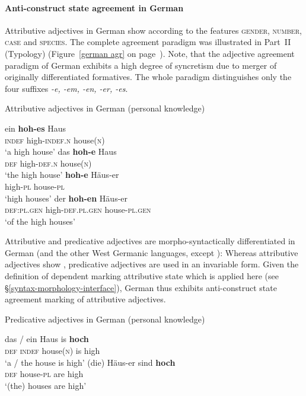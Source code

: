 \paragraph*{Anti\hyp{}construct state agreement in German}
Attributive adjectives in German show  according to the features \textsc{gender, number, case} and \textsc{species}. The complete agreement paradigm was illustrated in Part~II (Typology) (Figure~\ref{german agr} on page~\pageref{german agr}). Note, that the adjective agreement paradigm of German exhibits a high degree of syncretism due to merger of originally differentiated formatives. The whole paradigm distinguishes only the four suffixes \textit{-e, -em, -en, -er, -es}.
\begin{exe}
\ex \rm{Attributive adjectives in German (personal knowledge)}
\begin{xlist}
\ex
\gll	ein \textbf{hoh-es} Haus\\
	\textsc{indef} high-\textsc{indef.n} house(\textsc{n})\\
\glt	‘a high house’
\ex	
\gll	das \textbf{hoh-e} Haus\\
	\textsc{def} high-\textsc{def.n} house(\textsc{n})\\
\glt	‘the high house’
\ex	
\gll	\textbf{hoh-e} Häus-er\\
	high-\textsc{pl} house-\textsc{pl}\\
\glt	‘high houses’
\ex	
\gll	der \textbf{hoh-en} Häus-er\\
	\textsc{def:pl.gen} high-\textsc{def.pl.gen} house-\textsc{pl.gen}\\
\glt	‘of the high houses’
\end{xlist}
\end{exe}
Attributive and predicative adjectives are morpho-syntactically differentiated in German (and the other West Germanic languages, except ): Whereas attributive adjectives show , predicative adjectives are used in an invariable form. Given the definition of dependent marking attributive state which is applied here (see \S\ref{syntax-morphology-interface}), German thus exhibits anti\hyp{}construct state agreement marking of attributive adjectives.
\begin{exe}
\ex \rm{Predicative adjectives in German (personal knowledge)}
\begin{xlist}
\ex
\gll	das / ein Haus is \textbf{hoch}\\
	\textsc{def} {} \textsc{indef} house(\textsc{n}) is high\\
\glt	‘a / the house is high’
\ex	
\gll	(die) Häus-er sind \textbf{hoch}\\
	\textsc{def} house-\textsc{pl} are high\\
\glt	‘(the) houses are high’
\end{xlist}
\end{exe}

